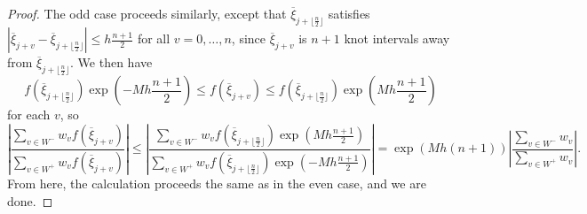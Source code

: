 \documentclass[10pt]{article}
\newcommand{\fracn}{\frac{n}{2}}
\theoremstyle{definition}
\numberwithin{equation}{section}
\numberwithin{figure}{section}
\numberwithin{table}{section}
\begin{document}
\begin{proof}
The odd case proceeds similarly, except that $\overline\xi_{j+\lfloor\fracn\rfloor}$ satisfies $|\overline\xi_{j+v}-\overline\xi_{j+\lfloor\fracn\rfloor}|\leq h\frac{n+1}{2}$ for all $v=0,\dots,n$, since $\overline\xi_{j+v}$ is $n+1$ knot intervals away from $\overline\xi_{j+\lfloor\fracn\rfloor}$. We then have
$$f(\overline\xi_{j+\lfloor\fracn\rfloor})\exp\left(-Mh\frac{n+1}{2}\right)\leq f(\overline\xi_{j+v})\leq f(\overline\xi_{j+\lfloor\fracn\rfloor})\exp\left(Mh\frac{n+1}{2}\right)$$
for each $v$, so 
$$\left|\frac{\sum_{v\in W^-}w_vf(\overline\xi_{j+v})}{\sum_{v\in W^+}w_vf(\overline\xi_{j+v})}\right|\leq\left|\frac{\sum_{v\in W^-}w_vf(\overline\xi_{j+\lfloor\fracn\rfloor})\exp(Mh\frac{n+1}{2})}{\sum_{v\in W^+}w_vf(\overline\xi_{j+\lfloor\fracn\rfloor})\exp(-Mh\frac{n+1}{2})}\right|=\exp(Mh(n+1))\left|\frac{\sum_{v\in W^-}w_v}{\sum_{v\in W^+}w_v}\right|.$$
From here, the calculation proceeds the same as in the even case, and we are done.
\end{proof}

\end{document}
